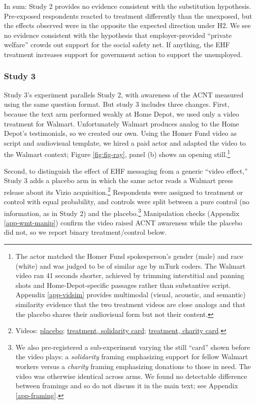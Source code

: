 \documentclass[
  11pt,
  oneside]{article}
\begin{document}
In sum: Study 2 provides no evidence consistent with the substitution hypothesis. Pre-exposed respondents reacted to treatment differently than the unexposed, but the effects observed were in the opposite the expected direction under H2. We see no evidence consistent with the hypothesis that employer-provided ``private welfare'' crowds out support for the social safety net. If anything, the EHF treatment increases support for government action to support the unemployed.

\subsubsection{Study 3}\label{study-3}

Study 3's experiment parallels Study 2, with awareness of the ACNT measured using the same question format. But study 3 includes three changes. First, because the text arm performed weakly at Home Depot, we used only a video treatment for Walmart. Unfortunately Walmart produces analog to the Home Depot's testimonials, so we created our own. Using the Homer Fund video as script and audiovisual template, we hired a paid actor and adapted the video to the Walmart context; Figure \ref{fig:fig-ray}, panel (b) shows an opening still.\footnote{The actor matched the Homer Fund spokesperson's gender (male) and race (white) and was judged to be of similar age by mTurk coders. The Walmart video ran 41 seconds shorter, achieved by trimming interstitial and panning shots and Home-Depot-specific passages rather than substantive script. Appendix \ref{app-vidsim} provides multimodal (visual, acoustic, and semantic) similarity evidence that the two treatment videos are close analogs and that the placebo shares their audiovisual form but not their content.}

Second, to distinguish the effect of EHF messaging from a generic ``video effect,'' Study 3 adds a placebo arm in which the same actor reads a Walmart press release about its Vizio acquisition.\footnote{Videos: \href{https://tinyurl.com/EHF-Study3-placebo}{placebo}; \href{https://tinyurl.com/EHFStudy3-solidarity}{treatment, solidarity card}; \href{https://tinyurl.com/EHF-Study3-charity}{treatment, charity card}.} Respondents were assigned to treatment or control with equal probability, and controls were split between a pure control (no information, as in Study 2) and the placebo.\footnote{We also pre-registered a sub-experiment varying the still ``card'' shown before the video plays: a \emph{solidarity} framing emphasizing support for fellow Walmart workers versus a \emph{charity} framing emphasizing donations to those in need. The video was otherwise identical across arms. We found no detectable difference between framings and so do not discuss it in the main text; see Appendix \ref{app-framing}.} Manipulation checks (Appendix \ref{app-wmt-manip}) confirm the video raised ACNT awareness while the placebo did not, so we report binary treatment/control below.
\end{document}
